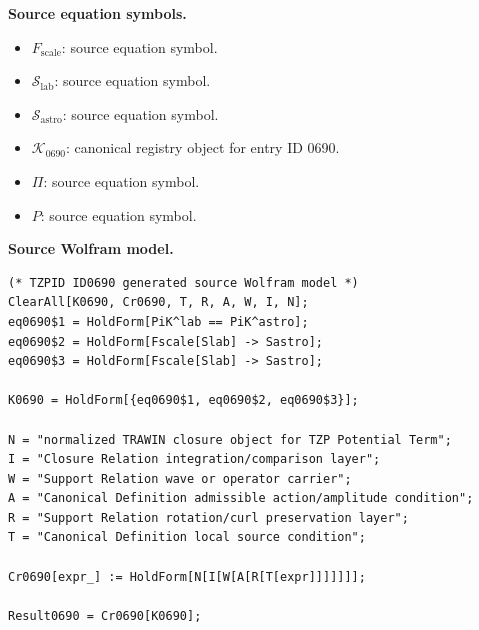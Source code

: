 \begin{minipage}[t]{0.49\linewidth}
\begingroup
\small
\raggedright
\textbf{Source equation symbols.}\par
\begin{itemize}[leftmargin=1.35em,itemsep=1pt,topsep=1pt,parsep=0pt]
    \item $F_{\mathrm{scale}}$: source equation symbol.
    \item $\mathcal{S}_{\mathrm{lab}}$: source equation symbol.
    \item $\mathcal{S}_{\mathrm{astro}}$: source equation symbol.
    \item $\mathcal{K}_{0690}$: canonical registry object for entry ID 0690.
    \item $\Pi$: source equation symbol.
    \item $P$: source equation symbol.
\end{itemize}
\endgroup
\end{minipage}\hfill
\begin{minipage}[t]{0.47\linewidth}
\begingroup
\scriptsize
\raggedright
\textbf{Source Wolfram model.}\par
\begin{Verbatim}[fontsize=\tiny,breaklines=true,breakanywhere=true]
(* TZPID ID0690 generated source Wolfram model *)
ClearAll[K0690, Cr0690, T, R, A, W, I, N];
eq0690$1 = HoldForm[PiK^lab == PiK^astro];
eq0690$2 = HoldForm[Fscale[Slab] -> Sastro];
eq0690$3 = HoldForm[Fscale[Slab] -> Sastro];

K0690 = HoldForm[{eq0690$1, eq0690$2, eq0690$3}];

N = "normalized TRAWIN closure object for TZP Potential Term";
I = "Closure Relation integration/comparison layer";
W = "Support Relation wave or operator carrier";
A = "Canonical Definition admissible action/amplitude condition";
R = "Support Relation rotation/curl preservation layer";
T = "Canonical Definition local source condition";

Cr0690[expr_] := HoldForm[N[I[W[A[R[T[expr]]]]]]];

Result0690 = Cr0690[K0690];
\end{Verbatim}
\endgroup
\end{minipage}

